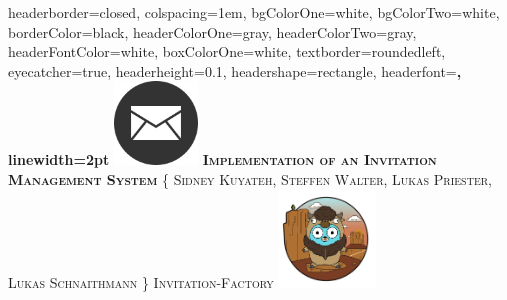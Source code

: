 \documentclass[landscape,a0paper,fontscale=0.35]{baposter} %
\begin{document}
\begin{poster}
{
headerborder=closed, %
colspacing=1em, %
bgColorOne=white, %
bgColorTwo=white, %
borderColor=black, %
headerColorOne=gray, %
headerColorTwo=gray, %
headerFontColor=white, %
boxColorOne=white, %
textborder=roundedleft, %
eyecatcher=true, %
headerheight=0.1\textheight, %
headershape=rectangle, %
headerfont=\Large\bf\textsc, %
linewidth=2pt %
}
%
{\includegraphics[height=6em]{favicon.png}} %
{\fontsize{32}{32} \textbf{\textsc{Implementation of an Invitation Management System}}\vspace{0.5em}} %
{\textsc{\{ Sidney Kuyateh, Steffen Walter, Lukas Priester, Lukas Schnaithmann \} \hspace{12pt} Invitation-Factory}} %
{\includegraphics[height=7em]{gobuffalo_logo.png}} %


\end{poster}
\end{document}
